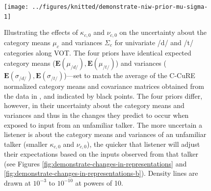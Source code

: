 \documentclass[
  11pt,
  man,floatsintext]{apa6}
\begin{document}
\begin{figure}

{\centering \texttt{[image: ../figures/knitted/demonstrate-niw-prior-mu-sigma-1]} 

}

\caption{Illustrating the effects of \(\kappa_{c,0}\) and \(\nu_{c,0}\) on the uncertainty about the category means \(\mu_c\) and variances \(\Sigma_c\) for univariate /d/ and /t/ categories along VOT. The four priors have identical expected category means (\(\mathbf{E}(\mu_{/d/}), \mathbf{E}(\mu_{/t/})\)) and variances (\(\mathbf{E}(\sigma_{/d/}), \mathbf{E}(\sigma_{/t/})\))---set to match the average of the C-CuRE normalized category means and covariance matrices obtained from the data in \textcite{chodroff-wilson2018}, and indicated by black points. The four priors differ, however, in their uncertainty about the category means and variances and thus in the changes they predict to occur when exposed to input from an unfamiliar talker. The more uncertain a listener is about the category means and variances of an unfamiliar talker (smaller \(\kappa_{c,0}\) and \(\nu_{c,0}\)), the quicker that listener will adjust their expectations based on the inputs observed from that talker (see Figures \ref{fig:demonstrate-changes-in-representations} and \ref{fig:demonstrate-changes-in-representations-b}). Density lines are drawn at \(10^{-3}\) to \(10^{-10}\) at powers of 10.}\label{fig:demonstrate-niw-prior-mu-sigma}
\end{figure}
\end{document}
